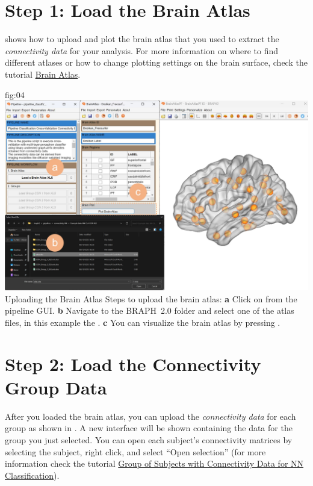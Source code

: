 \documentclass[justified]{tufte-handout}
\begin{document}
{\clearpage
\section{Step 1: Load the Brain Atlas}

 shows how to upload and plot the brain atlas that you used to extract the \emph{connectivity data} for your analysis. For more information on where to find different atlases or how to change plotting settings on the brain surface, check the tutorial \href{https://github.com/braph-software/BRAPH-2/tree/develop/tutorials/general/tut_ba}{Brain Atlas}.


	{fig:04}
	{
	\includegraphics{fig04.jpg}
	}
	{Uploading the Brain Atlas}
	{
	Steps to upload the brain atlas:
	{\bf a} Click on  from the pipeline GUI.
	{\bf b} Navigate to the BRAPH~2.0 folder  and select one of the atlas files, in this example the . 
	{\bf c} You can visualize the brain atlas by pressing . 
	}
 
\clearpage
\section{Step 2: Load the Connectivity Group Data}

After you loaded the brain atlas, you can upload the \emph{connectivity data} for each group as shown in . A new interface will be shown containing the data for the group you just selected. You can open each subject’s connectivity matrices by selecting the subject, right click, and select “Open selection” (for more information check the tutorial \href{https://github.com/braph-software/BRAPH-2/tree/develop/tutorials/general/tut_gr_con_nn/tut_gr_con_nn.pdf}{Group of Subjects with Connectivity Data for NN Classification}).

}
\end{document}
